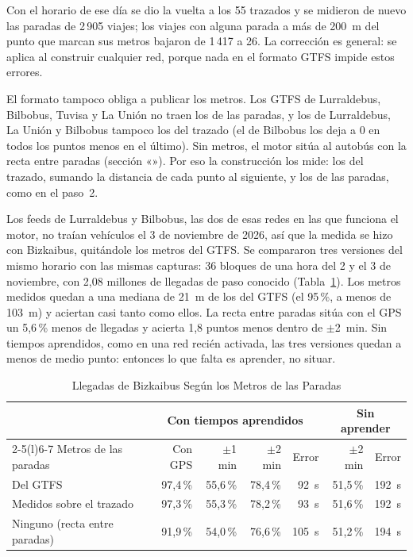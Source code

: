 \noindent Con el horario de ese día se dio la vuelta a los 55 trazados y se midieron de nuevo las paradas de 2\,905
viajes; los viajes con alguna parada a más de 200~m del punto que marcan sus metros bajaron de 1\,417 a 26. La corrección es general:
se aplica al construir cualquier red, porque nada en el formato GTFS impide estos errores.

El formato tampoco obliga a publicar los metros. Los GTFS de Lurraldebus, Bilbobus, Tuvisa y La Unión no traen los de
las paradas, y los de Lurraldebus, La Unión y Bilbobus tampoco los del trazado (el de Bilbobus los deja a 0 en todos los
puntos menos en el último). Sin metros, el motor sitúa al autobús con la recta entre paradas (sección «»).
Por eso la construcción los mide: los del trazado, sumando la distancia de cada punto al siguiente, y los de las
paradas, como en el paso~2.

Los feeds de Lurraldebus y Bilbobus, las dos de esas redes en las que funciona el motor, no traían vehículos el 3 de
noviembre de 2026, así que la medida se hizo con Bizkaibus, quitándole los metros del GTFS. Se compararon tres
versiones del mismo horario con las mismas capturas: 36 bloques de una hora del 2 y el 3 de noviembre, con 2,08
millones de llegadas de paso conocido (Tabla~\ref{tab:sin-metros}). Los metros medidos quedan a una mediana de 21~m de
los del GTFS (el 95\,\%, a menos de 103~m) y aciertan casi tanto como ellos. La recta entre paradas sitúa con el GPS un 5,6\,\% menos de llegadas y
acierta 1,8 puntos menos dentro de $\pm$2~min. Sin tiempos aprendidos, como en una red recién activada, las tres
versiones quedan a menos de medio punto: entonces lo que falta es aprender, no situar.

\begin{table}[ht]
\centering
\caption{Llegadas de Bizkaibus Según los Metros de las Paradas}\label{tab:sin-metros}
\begin{tabular}{@{}lrrrrrr@{}}
\toprule
 & \multicolumn{4}{c}{Con tiempos aprendidos} & \multicolumn{2}{c}{Sin aprender} \\
\cmidrule(lr){2-5}\cmidrule(l){6-7}
Metros de las paradas & Con GPS & $\pm$1 min & $\pm$2 min & Error & $\pm$2 min & Error \\
\midrule
Del GTFS & 97,4\,\% & 55,6\,\% & 78,4\,\% & 92~s & 51,5\,\% & 192~s \\
Medidos sobre el trazado & 97,3\,\% & 55,3\,\% & 78,2\,\% & 93~s & 51,6\,\% & 192~s \\
Ninguno (recta entre paradas) & 91,9\,\% & 54,0\,\% & 76,6\,\% & 105~s & 51,2\,\% & 194~s \\
\bottomrule
\end{tabular}

\end{table}

